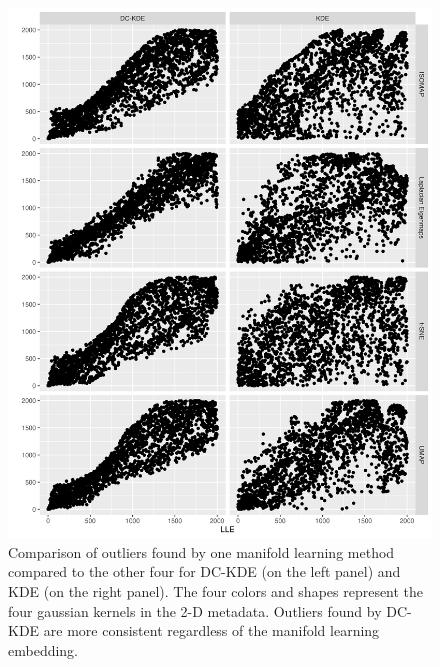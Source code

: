 \documentclass[11pt,a4paper,]{article}
\begin{document}
\begin{figure}

{\centering \includegraphics[width=0.95\linewidth]{figures/Twin Peak2000_density_compare_llevs4ml_radius8_r0_5_rank} 

}

\caption{Comparison of outliers found by one manifold learning method compared to the other four for DC-KDE (on the left panel) and KDE (on the right panel). The four colors and shapes represent the four gaussian kernels in the 2-D metadata. Outliers found by DC-KDE are more consistent regardless of the manifold learning embedding.}\label{fig:tpllevs4ml-1}
\end{figure}
\end{document}
